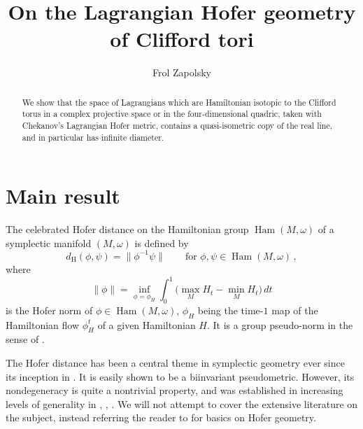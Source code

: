 \documentclass[11pt%
]{article}
\theoremstyle{definition}
\DeclareMathOperator{\Ham}{Ham}
\DeclareMathOperator{\0}{\operatorname{\mathbf{0}}}
\begin{document}
\title{On the Lagrangian Hofer geometry of Clifford tori}

\author{Frol Zapolsky}


\setcounter{tocdepth}{3}

\renewcommand{\labelenumi}{(\roman{enumi})}

\maketitle


\begin{abstract}
  We show that the space of Lagrangians which are Hamiltonian isotopic to the Clifford torus in a complex projective space or in the four-dimensional quadric, taken with Chekanov's Lagrangian Hofer metric, contains a quasi-isometric copy of the real line, and in particular has infinite diameter.
\end{abstract}


\section{Main result}

The celebrated Hofer distance on the Hamiltonian group $\Ham(M,\omega)$ of a symplectic manifold $(M,\omega)$ is defined by
$$d_{\mathrm H}(\phi,\psi)=\|\phi^{-1}\psi\| \qquad\text{for }\phi,\psi \in \Ham(M,\omega)\,,$$
where
$$\|\phi\| = \inf_{\phi=\phi_H}\int_0^1\Big(\max_MH_t - \min_MH_t\Big)\,dt$$
is the Hofer norm of $\phi \in \Ham(M,\omega)$, $\phi_H$ being the time-$1$ map of the Hamiltonian flow $\phi_H^t$ of a given Hamiltonian $H$. It is a group pseudo-norm in the sense of \cite{Burago_Ivanov_Polterovich_Conj_Invt_Norms_Groups_Geom_Origin}.

The Hofer distance has been a central theme in symplectic geometry ever since its inception in \cite{Hofer_Top_Props_Symplectic_Maps}. It is easily shown to be a biinvariant pseudometric. However, its nondegeneracy is quite a nontrivial property, and was established in increasing levels of generality in \cite{Hofer_Top_Props_Symplectic_Maps}, \cite{Polterovich_Symplectic_Displacement_Energy_Lag_Submfds}, \cite{Lalonde_McDuff_Geom_Sympl_Energy}. We will not attempt to cover the extensive literature on the subject, instead referring the reader to \cite{Polterovich_Geom_Group_Sympl_Diffeos} for basics on Hofer geometry.
\end{document}
